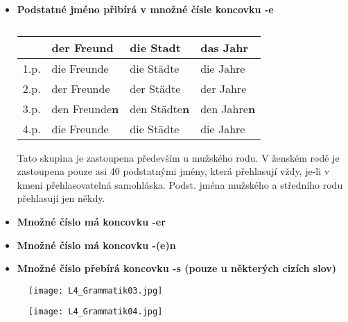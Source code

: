 \begin{itemize}
\begin{itemize}
            \item \textbf{Podstatné jméno přibírá v množné čísle koncovku -e}
              \begin{table}[ht!]   %
                \hspace*{4em}
                \begin{tabular}{l|lll}
                       & \textbf{der Freund}   & \textbf{die Stadt}   & \textbf{das Jahr}    \\
                  \hline
                  1.p. & die Freunde           & die Städte           & die Jahre            \\
                  2.p. & der Freunde           & der Städte           & der Jahre            \\
                  3.p. & den Freunde\textbf{n} & den Städte\textbf{n} & den Jahre\textbf{n}  \\
                  4.p. & die Freunde           & die Städte           & die Jahre            \\
                  \hline
                \end{tabular}
                \caption*{ }
              \end{table}

              Tato skupina je zastoupena především u mužského rodu. V ženském rodě je zastoupena 
              pouze asi 40 podstatnými jmény, která přehlasují vždy, je-li v kmeni přehlasovatelná 
              samohláska. Podst. jména mužského a středního rodu přehlasují jen někdy.
              
            \item \textbf{Množné číslo má koncovku -er}
            \item \textbf{Množné číslo má koncovku -(e)n}
            \item \textbf{Množné číslo přebírá koncovku -s (pouze u některých cizích slov)}\newline
         \end{itemize}
      \end{itemize}
    
    \begin{figure}[ht!]
      \centering
      \texttt{[image: L4\_Grammatik03.jpg]}
      \caption*{ }
      \label{NJ:fig_L4_Grammatik03}
    \end{figure}
    
    \begin{figure}[ht!]
      \centering
      \texttt{[image: L4\_Grammatik04.jpg]}
      \caption*{ }
      \label{NJ:fig_L4_Grammatik04}
    \end{figure}
    
